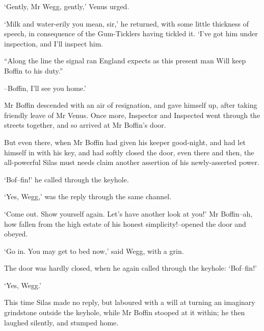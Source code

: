 ‘Gently, Mr Wegg, gently,’ Venus urged.

‘Milk and water-erily you mean, sir,’ he returned, with some little
thickness of speech, in consequence of the Gum-Ticklers having tickled
it. ‘I’ve got him under inspection, and I’ll inspect him.

     “Along the line the signal ran
     England expects as this present man
     Will keep Boffin to his duty.”

--Boffin, I’ll see you home.’

Mr Boffin descended with an air of resignation, and gave himself up,
after taking friendly leave of Mr Venus. Once more, Inspector and
Inspected went through the streets together, and so arrived at Mr
Boffin’s door.

But even there, when Mr Boffin had given his keeper good-night, and had
let himself in with his key, and had softly closed the door, even there
and then, the all-powerful Silas must needs claim another assertion of
his newly-asserted power.

‘Bof--fin!’ he called through the keyhole.

‘Yes, Wegg,’ was the reply through the same channel.

‘Come out. Show yourself again. Let’s have another look at you!’
Mr Boffin--ah, how fallen from the high estate of his honest
simplicity!--opened the door and obeyed.

‘Go in. You may get to bed now,’ said Wegg, with a grin.

The door was hardly closed, when he again called through the keyhole:
‘Bof--fin!’

‘Yes, Wegg.’

This time Silas made no reply, but laboured with a will at turning an
imaginary grindstone outside the keyhole, while Mr Boffin stooped at it
within; he then laughed silently, and stumped home.



